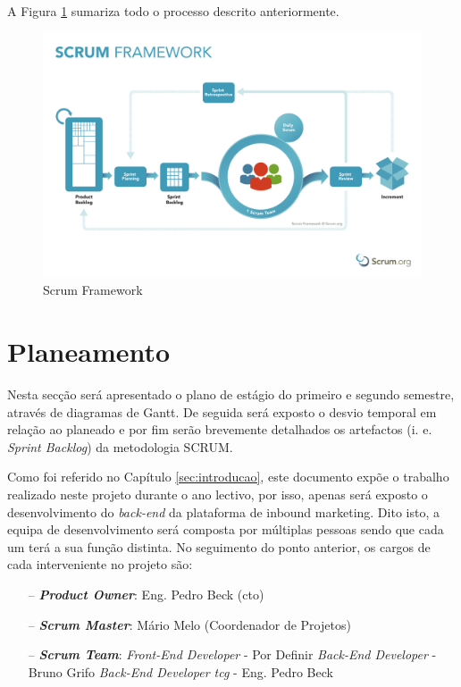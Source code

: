 A Figura \ref{fig:scrum} sumariza todo o processo descrito anteriormente.



\begin{figure}[ht!]
	\begin{center}
		\includegraphics[width=1\textwidth]{img/scrum.pdf}
		\caption{Scrum Framework\cite{scrumimg}}
		\label{fig:scrum}
	\end{center}
\end{figure}

\newpage

\section{Planeamento}
\label{planeamento}

Nesta secção será apresentado o plano de estágio do primeiro e segundo semestre, através de diagramas de Gantt.  De seguida será exposto o desvio temporal em relação ao planeado e por fim serão brevemente detalhados os artefactos (i. e. \textit{Sprint Backlog}) da metodologia SCRUM.

Como foi referido no Capítulo \ref{sec:introducao}, este documento expõe o trabalho realizado neste projeto durante o ano lectivo, por isso, apenas será exposto o desenvolvimento do \textit{back-end} da plataforma de inbound marketing. Dito isto, a equipa de desenvolvimento será composta por múltiplas pessoas sendo que cada um terá a sua função distinta.
No seguimento do ponto anterior, os cargos de cada interveniente no projeto são:
\begin{itemize}
	\item[--] \textbf{\textit{Product Owner}}: Eng. Pedro Beck (\acrfull{cto})
	\item[--] \textbf{\textit{Scrum Master}}: Mário Melo (Coordenador de Projetos)
	\item[--] \textbf{\textit{Scrum Team}}: 
	\subitem  \textit{Front-End Developer} - Por Definir
	\subitem  \textit{Back-End Developer} - Bruno Grifo
	\subitem  \textit{Back-End Developer \acrshort{tcg}} - Eng. Pedro Beck
\end{itemize}

